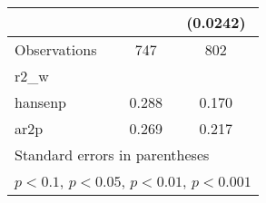 {\begin{tabular}{l*{2}{c}}
                    &                     &    (0.0242)         \\
\hline
Observations        &         747         &         802         \\
r2\_w                &                     &                     \\
hansenp             &       0.288         &       0.170         \\
ar2p                &       0.269         &       0.217         \\
\hline\hline
\multicolumn{3}{l}{\footnotesize Standard errors in parentheses}\\
\multicolumn{3}{l}{\footnotesize \sym{+} \(p<0.1\), \sym{*} \(p<0.05\), \sym{**} \(p<0.01\), \sym{***} \(p<0.001\)}\\
\end{tabular}
}
